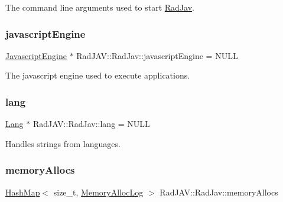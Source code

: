 The command line arguments used to start \mbox{\hyperlink{class_rad_j_a_v_1_1_rad_jav}{Rad\+Jav}}. 

\mbox{\label{class_rad_j_a_v_1_1_rad_jav_aa80128a74f47d969173d2e7946e0ae6c}} 
\subsubsection{\texorpdfstring{javascript\+Engine}{javascriptEngine}}
{\footnotesize\ttfamily \mbox{\hyperlink{class_rad_j_a_v_1_1_javascript_engine}{Javascript\+Engine}} $\ast$ Rad\+J\+A\+V\+::\+Rad\+Jav\+::javascript\+Engine = N\+U\+LL\hspace{0.3cm}{\ttfamily [static]}}



The javascript engine used to execute applications. 

\mbox{\label{class_rad_j_a_v_1_1_rad_jav_ac27c2fc21e98d8961c7e98099b71c4f3}} 
\subsubsection{\texorpdfstring{lang}{lang}}
{\footnotesize\ttfamily \mbox{\hyperlink{class_rad_j_a_v_1_1_lang}{Lang}} $\ast$ Rad\+J\+A\+V\+::\+Rad\+Jav\+::lang = N\+U\+LL\hspace{0.3cm}{\ttfamily [static]}}



Handles strings from languages. 

\mbox{\label{class_rad_j_a_v_1_1_rad_jav_abb9c47c4a37be67599ee136f9fbbd33e}} 
\subsubsection{\texorpdfstring{memory\+Allocs}{memoryAllocs}}
{\footnotesize\ttfamily \mbox{\hyperlink{namespace_rad_j_a_v_a7c83af3095bdd8035fd71ff008120f08}{Hash\+Map}}$<$ size\+\_\+t, \mbox{\hyperlink{class_rad_j_a_v_1_1_memory_alloc_log}{Memory\+Alloc\+Log}} $>$ Rad\+J\+A\+V\+::\+Rad\+Jav\+::memory\+Allocs\hspace{0.3cm}{\ttfamily [static]}}



